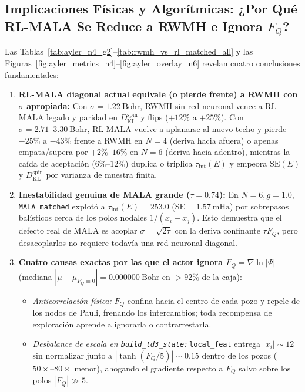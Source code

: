 \documentclass[10pt,a4paper]{article}
\begin{document}
\subsection{Implicaciones Físicas y Algorítmicas: ¿Por Qué RL-MALA Se Reduce a RWMH e Ignora $F_Q$?}

Las Tablas~\ref{tab:ayler_n4_g2}--\ref{tab:rwmh_vs_rl_matched_all} y las Figuras~\ref{fig:ayler_metrics_n4}--\ref{fig:ayler_overlay_n6} revelan cuatro conclusiones fundamentales:

\begin{enumerate}
\item \textbf{RL-MALA diagonal actual equivale (o pierde frente) a RWMH con $\sigma$ apropiada:} Con $\sigma=1.22\ \mathrm{Bohr}$, RWMH sin red neuronal vence a RL-MALA legado y paridad en $D_{\mathrm{KL}}^{\mathrm{spin}}$ y flips ($+12\%$ a $+25\%$). Con $\sigma=2.71\text{--}3.30\ \mathrm{Bohr}$, RL-MALA vuelve a aplanarse al nuevo techo y pierde $-25\%$ a $-43\%$ frente a RWMH en $N=4$ (deriva hacia afuera) o apenas empata/supera por $+2\%\text{--}16\%$ en $N=6$ (deriva hacia adentro), mientras la caída de aceptación ($6\%\text{--}12\%$) duplica o triplica $\tau_{\mathrm{int}}(E)$ y empeora $\mathrm{SE}(E)$ y $D_{\mathrm{KL}}^{\mathrm{spin}}$ por varianza de muestra finita.
\item \textbf{Inestabilidad genuina de MALA grande ($\tau=0.74$):} En $N=6, g=1.0$, \texttt{MALA\_matched} explotó a $\tau_{\mathrm{int}}(E) = 253.0$ ($\mathrm{SE}=1.57\ \mathrm{mHa}$) por sobrepasos balísticos cerca de los polos nodales $1/(x_i-x_j)$. Esto demuestra que el defecto real de MALA es acoplar $\sigma=\sqrt{2\tau}$ con la deriva confinante $\tau F_Q$, pero desacoplarlos no requiere todavía una red neuronal diagonal.
\item \textbf{Cuatro causas exactas por las que el actor ignora $F_Q = \nabla \ln|\Psi|$} (mediana $|\mu - \mu_{F_Q\equiv 0}| = 0.000000\ \mathrm{Bohr}$ en $>92\%$ de la caja):
  \begin{itemize}
  \item \textit{Anticorrelación física:} $F_Q$ confina hacia el centro de cada pozo y repele de los nodos de Pauli, frenando los intercambios; toda recompensa de exploración aprende a ignorarla o contrarrestarla.
  \item \textit{Desbalance de escala en \texttt{build\_td3\_state}:} \texttt{local\_feat} entrega $|x_i| \sim 12$ sin normalizar junto a $|\tanh(F_Q/5)| \sim 0.15$ dentro de los pozos ($50\times\text{--}80\times$ menor), ahogando el gradiente respecto a $F_Q$ salvo sobre los polos $|F_Q| \gg 5$.

\end{itemize}
\end{enumerate}
\end{document}
